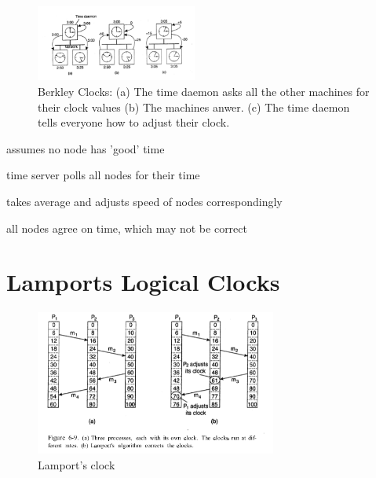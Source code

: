\documentclass[ngerman,a4paper]{report}
\begin{document}
\begin{figure}[h]
	\centering
	\includegraphics[width=200px]{gfx/berkeley.png}
	\caption{Berkley Clocks: (a) The time daemon asks all the other machines for their clock values (b) The machines anwer.  (c) The time daemon tells everyone how to adjust their clock.}
	\label{img:berkeley}
\end{figure}

\begin{compactitem}
\item assumes no node has 'good' time
\item time server polls all nodes for their time
\item takes average and adjusts speed of nodes correspondingly
\item all nodes agree on time, which may not be correct
\end{compactitem}



\section{Lamports Logical Clocks}

\begin{figure}[h]
	\centering
	\includegraphics[width=300px]{gfx/lamport.png}
	\caption{Lamport's clock}
	\label{img:lamport}
\end{figure}
\end{document}
